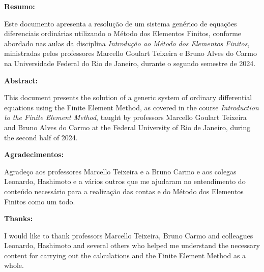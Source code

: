 \maketitle
\newpage

\begin{center}
  \textbf{Resumo:}
\end{center}

  Este documento apresenta a resolução de um sistema genérico de equações diferenciais ordinárias utilizando o Método dos Elementos Finitos, conforme abordado nas aulas da disciplina \textit{Introdução ao Método dos Elementos Finitos}, ministradas pelos professores Marcello Goulart Teixeira e Bruno Alves do Carmo na Universidade Federal do Rio de Janeiro, durante o segundo semestre de 2024.

  \vspace{0.3cm}

  \begin{center}
    \textbf{Abstract:}
  \end{center}

  This document presents the solution of a generic system of ordinary differential equations using the Finite Element Method, as covered in the course \textit{Introduction to the Finite Element Method}, taught by professors Marcello Goulart Teixeira and Bruno Alves do Carmo at the Federal University of Rio de Janeiro, during the second half of 2024.

  \vspace{0.3cm}

  \begin{center}
    \textbf{Agradecimentos:}
  \end{center}

  Agradeço aos professores Marcello Teixeira e a Bruno Carmo e aos colegas Leonardo, Hashimoto e a vários outros que me ajudaram no entendimento do conteúdo necessário para a realização das contas e do Método dos Elementos Finitos como um todo.

  \vspace{0.3cm}

  \begin{center}
    \textbf{Thanks:}
  \end{center}

  I would like to thank professors Marcello Teixeira, Bruno Carmo and colleagues Leonardo, Hashimoto and several others who helped me understand the necessary content for carrying out the calculations and the Finite Element Method as a whole.


\newpage \tableofcontents
\newpage
